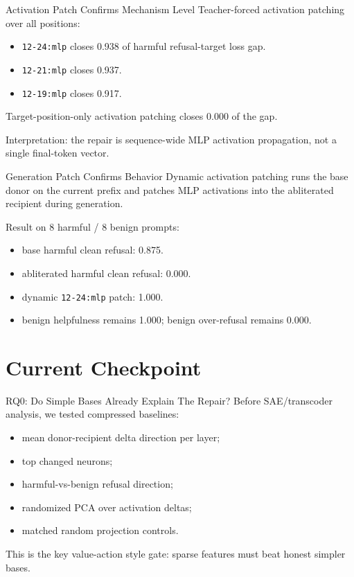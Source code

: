 \documentclass[aspectratio=169]{beamer}
\begin{document}
\begin{frame}{Activation Patch Confirms Mechanism Level}
  Teacher-forced activation patching over all positions:
  \begin{itemize}
    \item \texttt{12-24:mlp} closes 0.938 of harmful refusal-target loss gap.
    \item \texttt{12-21:mlp} closes 0.937.
    \item \texttt{12-19:mlp} closes 0.917.
  \end{itemize}

  \vspace{0.25cm}
  Target-position-only activation patching closes 0.000 of the gap.

  \vspace{0.25cm}
  Interpretation: the repair is sequence-wide MLP activation propagation, not a single final-token vector.
\end{frame}

\begin{frame}{Generation Patch Confirms Behavior}
  Dynamic activation patching runs the base donor on the current prefix and patches MLP activations into the abliterated recipient during generation.

  \vspace{0.3cm}
  Result on 8 harmful / 8 benign prompts:
  \begin{itemize}
    \item base harmful clean refusal: 0.875.
    \item abliterated harmful clean refusal: 0.000.
    \item dynamic \texttt{12-24:mlp} patch: 1.000.
    \item benign helpfulness remains 1.000; benign over-refusal remains 0.000.
  \end{itemize}
\end{frame}

\section{Current Checkpoint}

\begin{frame}{RQ0: Do Simple Bases Already Explain The Repair?}
  Before SAE/transcoder analysis, we tested compressed baselines:

  \begin{itemize}
    \item mean donor-recipient delta direction per layer;
    \item top changed neurons;
    \item harmful-vs-benign refusal direction;
    \item randomized PCA over activation deltas;
    \item matched random projection controls.
  \end{itemize}

  \vspace{0.25cm}
  This is the key value-action style gate: sparse features must beat honest simpler bases.
\end{frame}
\end{document}
